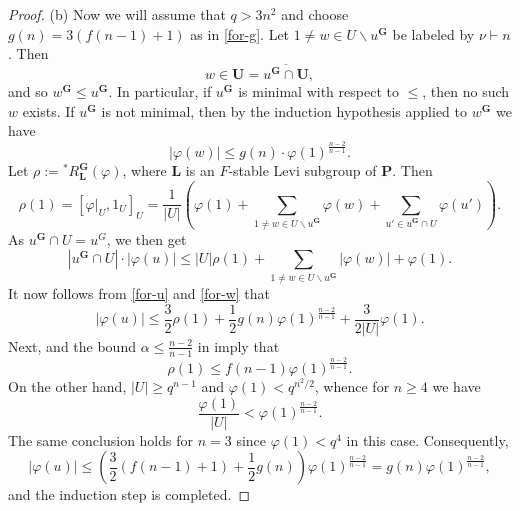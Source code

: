 \documentclass[eqthmnum,nocolour,skinny]{jt-calcs}
\newcommand{\GC}{\mathbf {G}}
\newcommand{\UC}{\mathbf {U}}
\newcommand{\PC}{\mathbf {P}}
\newcommand{\al}{\alpha}
\newcommand{\LC}{\mathbf {L}}
\begin{document}
\begin{proof}
(b) Now we will assume that $q > 3n^2$ and choose $g(n) = 3(f(n-1)+1)$ as in \eqref{for-g}. 
Let $1 \neq w \in U \smallsetminus u^\GC$ be labeled by $\nu \vdash n$. Then
\begin{equation*}
w \in \UC = \overline{u^\GC \cap \UC},
\end{equation*}
and so $w^\GC \leq u^\GC$. In particular, if $u^\GC$ is minimal with respect to $\leq$, then
no such $w$ exists. If $u^\GC$ is not minimal, then by the induction hypothesis applied to $w^\GC$ we have
\begin{equation}\label{for-w}
  |\varphi(w)| \leq g(n) \cdot \varphi(1)^{\frac{n-2}{n-1}}.
\end{equation}
Let $\rho := {}^*R^\GC_\LC(\varphi)$, where $\LC$ is an $F$-stable Levi subgroup of $\PC$. Then
\begin{equation*}
\rho(1) = [\varphi|_U,1_U]_U = \frac{1}{|U|}\left( \varphi(1) + \sum_{1 \neq w \in U \smallsetminus u^\GC}\varphi(w) + \sum_{u' \in u^\GC \cap U}\varphi(u')\right).
\end{equation*}
As $u^\GC \cap U = u^G$, we then get
\begin{equation*}
|u^\GC \cap U|\cdot|\varphi(u)|  \leq |U|\rho(1) + \sum_{1 \neq w \in U \smallsetminus u^\GC}|\varphi(w)| + \varphi(1).
\end{equation*}
It now follows from \eqref{for-u} and \eqref{for-w} that
\begin{equation*}
|\varphi(u)| \leq \frac{3}{2}\rho(1) + \frac{1}{2}g(n)\varphi(1)^{\frac{n-2}{n-1}} + \frac{3}{2|U|}\varphi(1).
\end{equation*}
Next, \cite[Thm.~1.1]{bezrukavnikov-liebeck-shalev-tiep:2017:character-bounds-grps-Lie-type} and the bound $\al \le \frac{n-2}{n-1}$ in 
\cite[Prop.~4.5]{bezrukavnikov-liebeck-shalev-tiep:2017:character-bounds-grps-Lie-type} imply that
\begin{equation*}
\rho(1) \leq f(n-1)\varphi(1)^{\frac{n-2}{n-1}}.
\end{equation*}
On the other hand,
$|U| \geq q^{n-1}$ and $\varphi(1) < q^{n^2/2}$, whence for $n \geq 4$ we have
\begin{equation*}
\frac{\varphi(1)}{|U|} < \varphi(1)^{\frac{n-2}{n-1}}.
\end{equation*}
The same conclusion holds for $n = 3$ since $\varphi(1) < q^4$ in this case. Consequently,
\begin{equation*}
|\varphi(u)| \leq \left(\frac{3}{2}(f(n-1)+1)+\frac{1}{2}g(n)\right)\varphi(1)^{\frac{n-2}{n-1}} = g(n)\varphi(1)^{\frac{n-2}{n-1}},
\end{equation*}
and the induction step is completed.
\end{proof}
\end{document}
